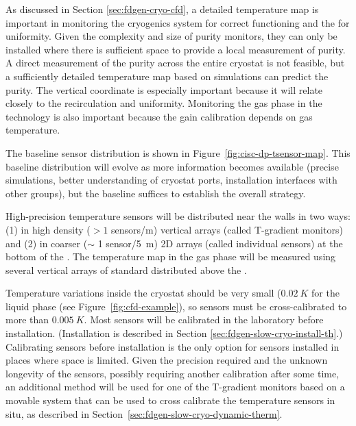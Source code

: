 
As discussed in Section \ref{sec:fdgen-cryo-cfd}, a detailed \threed temperature map is important %
in monitoring %
the cryogenics system for correct functioning and the \lar for uniformity.
Given the complexity and size of purity monitors, they can only be installed where there is sufficient space to provide a local measurement of
\lar purity. 
A direct measurement of the  purity across the entire cryostat is not feasible, but a sufficiently detailed \threed temperature map based on  simulations can predict the purity. The vertical coordinate is especially important because it will relate closely to the 
 recirculation and uniformity. Monitoring the gas phase in the  technology is also important because the  gain calibration depends on gas temperature. 

 
The baseline sensor distribution 
is shown in Figure~\ref{fig:cisc-dp-tsensor-map}. This baseline distribution will evolve as more information becomes available (precise  simulations, better understanding of cryostat ports, installation interfaces with other groups), but the baseline suffices to establish the overall strategy.




High-precision temperature sensors will be distributed near the   walls in two ways:
(1) in high density (\(>1\) sensors/\si{m}) vertical arrays %
(called T-gradient monitors) and (2) in coarser ($\sim$ 1 sensor/\SI{5}{m}) 2D arrays %
(called individual sensors) at the bottom of the .
The temperature map in the gas phase will be measured using several vertical arrays of standard  distributed above the .  



Temperature variations inside the cryostat should be very small ($\SI{0.02}{K}$ for the liquid phase (see Figure~\ref{fig:cfd-example}),
so sensors must be cross-calibrated to more than $\SI{0.005}{K}$. Most sensors will be calibrated in the laboratory before installation.
(Installation is described in Section \ref{sec:fdgen-slow-cryo-install-th}.)
Calibrating sensors before installation is the only option for sensors installed in places where space is limited. 
Given the precision required and the unknown longevity of the sensors, possibly requiring another  calibration after some time, an additional method
will be used for one of the T-gradient monitors based on a movable system that can be used to cross calibrate
the temperature sensors in situ, as described in Section~\ref{sec:fdgen-slow-cryo-dynamic-therm}.

